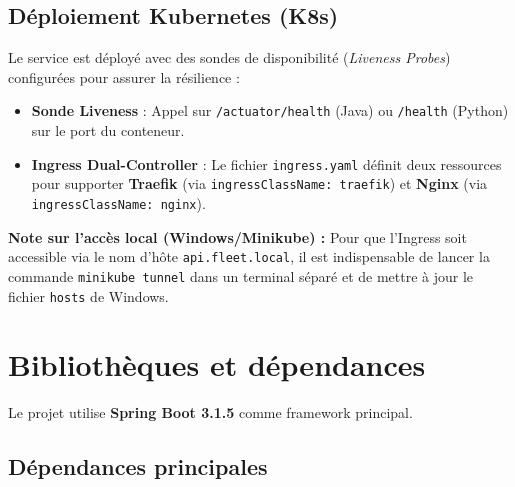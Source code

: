 \documentclass[12pt,a4paper]{report}
\begin{document}
\section{D\'eploiement Kubernetes (K8s)}

Le service est d\'eploy\'e avec des sondes de disponibilit\'e (\textit{Liveness Probes}) configur\'ees pour assurer la r\'esilience :
\begin{itemize}
    \item \textbf{Sonde Liveness} : Appel sur \texttt{/actuator/health} (Java) ou \texttt{/health} (Python) sur le port du conteneur.
    \item \textbf{Ingress Dual-Controller} : Le fichier \texttt{ingress.yaml} d\'efinit deux ressources pour supporter \textbf{Traefik} (via \texttt{ingressClassName: traefik}) et \textbf{Nginx} (via \texttt{ingressClassName: nginx}).
\end{itemize}

\begin{infobox}
\textbf{Note sur l'acc\`es local (Windows/Minikube) :}
Pour que l'Ingress soit accessible via le nom d'h\^ote \texttt{api.fleet.local}, il est indispensable de lancer la commande \texttt{minikube tunnel} dans un terminal s\'epar\'e et de mettre \`a jour le fichier \texttt{hosts} de Windows.
\end{infobox}
\chapter{Biblioth\`eques et d\'ependances}

Le projet utilise \textbf{Spring Boot 3.1.5} comme framework principal.

\section{D\'ependances principales}
\end{document}
